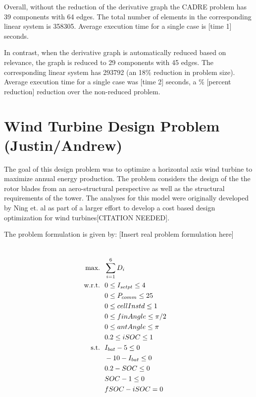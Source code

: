 \documentclass[]{aiaa-tc} %
\newcommand{\txt}{\textrm}
\begin{document}
            Overall, without the reduction of the derivative graph the CADRE problem
            has 39 components with 64 edges. The total number of elements in
            the corresponding linear system is 358305. Average execution time
            for a single case is [time 1] seconds.

            In contrast, when the derivative graph is automatically reduced based on
            relevance, the graph is reduced to 29 components with 45 edges.
            The corresponding linear system has 293792 (an 18\% reduction in
            problem size). Average execution time for a single case was
            [time 2] seconds, a \% [percent reduction] reduction over the
            non-reduced problem.


  \section{Wind Turbine Design Problem (Justin/Andrew)}

    The goal of this design problem was to optimize a horizontal axis wind turbine
    to maximize annual energy production. The problem considers the design of
    the the rotor blades from an aero-structural perspective as well as the structural requirements of the tower. The analyses for this model were originally developed
    by Ning et. al as part of a larger effort to develop a cost based design optimization
    for wind turbines[CITATION NEEDED].

    The problem formulation is given by: [Insert real problem formulation here]

    \begin{align}
        \\\txt{max.} &\ \ \sum_{i=1}^6 D_i \notag
        \\\txt{w.r.t.} & \ \ 0 \le I_{setpt} \le 4 \notag
        \\     & \ \ 0 \le P_{comm} \le 25 \notag
        \\     & \ \ 0 \le cellInstd \le 1 \notag
        \\     & \ \ 0 \le finAngle \le \pi/2 \notag
        \\     & \ \ 0 \le antAngle \le \pi \notag
        \\     & \ \ 0.2 \le iSOC \le 1 \notag
        \\\txt{s.t.} & \ \ I_{bat} - 5 \le 0 \notag
        \\     & \ \ -10 - I_{bat} \le 0 \notag
        \\     & \ \ 0.2 - SOC \le 0 \notag
        \\     & \ \ SOC - 1 \le 0 \notag
        \\     & \ \ fSOC - iSOC = 0 \notag
        \label{eqn:wt_formulation}
    \end{align}
\end{document}
